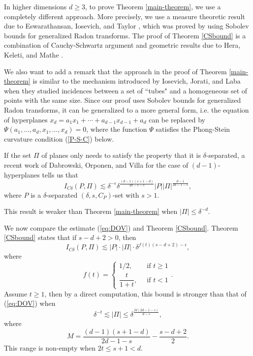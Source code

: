 \documentclass[11pt]{article}
\newcommand{\1}{\mathbf{1}}
\begin{document}
In higher dimensions $d\ge 3$, to prove Theorem \ref{main-theorem}, we use a completely different approach. More precisely, we use a measure theoretic result due to Eswarathansan, Iosevich, and Taylor \cite{Alex}, which was proved by using Sobolev bounds for generalized Radon transforms. The proof of Theorem \ref{CSbound} is a combination of Cauchy-Schwartz  argument and geometric results due to Hera, Keleti, and Mathe \cite{HKM}.

We also want to add a remark that the approach in the proof of Theorem \ref{main-theorem} is similar to the mechanism introduced by Iosevich, Jorati, and Laba \cite{III} when they studied incidences between a set of ``tubes" and a homogeneous set of points with the same size. Since our proof uses Sobolev bounds for generalized Radon transforms, it can be generalized to a more general form, i.e. the equation of hyperplanes $x_d=a_1x_1+\cdots+a_{d-1}x_{d-1}+a_d$ can be replaced by $\Psi(a_1, \ldots, a_d, x_1, \ldots, x_d)=0$, where the function $\Psi$ satisfies the Phong-Stein curvature condition (\ref{P-S-C}) below.

If the set $\Pi$ of planes  only needs to satisfy the property that it is $\delta$-separated, a recent work of Dabrowski, Orponen, and Villa \cite{DOV} for the case of $(d-1)$-hyperplanes tells us that
\begin{equation}\label{eq:DOV}I_{C\delta}(P, \Pi)\lesssim \delta^{-\epsilon}\delta^{\frac{(d-1)(s+1-d)}{2d-1-s}}|P||\Pi|^{\frac{d-1}{2d-1-s}},\end{equation}
where $P$ is a $\delta$-separated $(\delta, s, C_P)$-set with $s>1$.

This result is weaker than Theorem \ref{main-theorem} when $|\Pi|\le \delta^{-d}$.

We now compare the estimate (\ref{eq:DOV}) and Theorem \ref{CSbound}. Theorem \ref{CSbound} states that if $s-d+2>0$, then
\[I_{C\delta}(P,\Pi)\lesssim  |P|\cdot|\Pi|\cdot \delta^{f(t)(s-d+2) - \epsilon},\] where  \[
    f(t) =
    \begin{cases}
        1/2,  ~           & \text{ if } t\ge 1 \\
        \dfrac{t}{1+t}, ~ & \text{ if } t<1
    \end{cases}.\]
Assume $t\ge 1$, then by a direct computation, this bound is stronger than that of (\ref{eq:DOV}) when
\[\delta^{-t}\lesssim |\Pi|\le \delta^{\frac{M(2d-1-s)}{d-s}},\]
where
\[M=\frac{(d-1)(s+1-d)}{2d-1-s}-\frac{s-d+2}{2}.\]
This range is non-empty when $2t\le s+1<d$.
\end{document}

